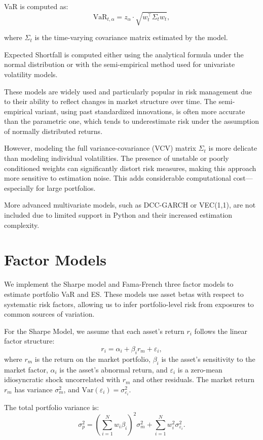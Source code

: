 \documentclass[12pt]{article}
\begin{document}
VaR is computed as:
\[
\text{VaR}_{t,\alpha} = z_\alpha \cdot \sqrt{w_t^\top \Sigma_t w_t},
\]

where \( \Sigma_t \) is the time-varying covariance matrix estimated by the model.

Expected Shortfall is computed either using the analytical formula under the normal distribution or with the semi-empirical method used for univariate volatility models.

These models are widely used and particularly popular in risk management due to their ability to reflect changes in market structure over time. The semi-empirical variant, using past standardized innovations, is often more accurate than the parametric one, which tends to underestimate risk under the assumption of normally distributed returns.

However, modeling the full variance-covariance (VCV) matrix \( \Sigma_t \) is more delicate than modeling individual volatilities. The presence of unstable or poorly conditioned weights can significantly distort risk measures, making this approach more sensitive to estimation noise. This adds considerable computational cost—especially for large portfolios.

More advanced multivariate models, such as DCC-GARCH or VEC(1,1), are not included due to limited support in Python and their increased estimation complexity.


\section{Factor Models}

We implement the Sharpe model and Fama-French three factor models to estimate portfolio VaR and ES. These models use asset betas with respect to systematic risk factors, allowing us to infer portfolio-level risk from exposures to common sources of variation.

For the Sharpe Model, we assume that each asset’s return $r_i$ follows the linear factor structure:
\[
r_i = \alpha_i + \beta_i r_m + \varepsilon_i,
\]
where $r_m$ is the return on the market portfolio, $\beta_i$ is the asset's sensitivity to the market factor, \( \alpha_i \) is the asset's abnormal return, and $\varepsilon_i$ is a zero-mean idiosyncratic shock uncorrelated with $r_m$ and other residuals. The market return $r_m$ has variance $\sigma_m^2$, and $\mathrm{Var}(\varepsilon_i) = \sigma_{\varepsilon_i}^2$.


The total portfolio variance is:
\[
\sigma_p^2 = \left(\sum_{i=1}^N w_i \beta_i\right)^2 \sigma_m^2 + \sum_{i=1}^N w_i^2 \sigma_{\varepsilon_i}^2.
\]
\end{document}
